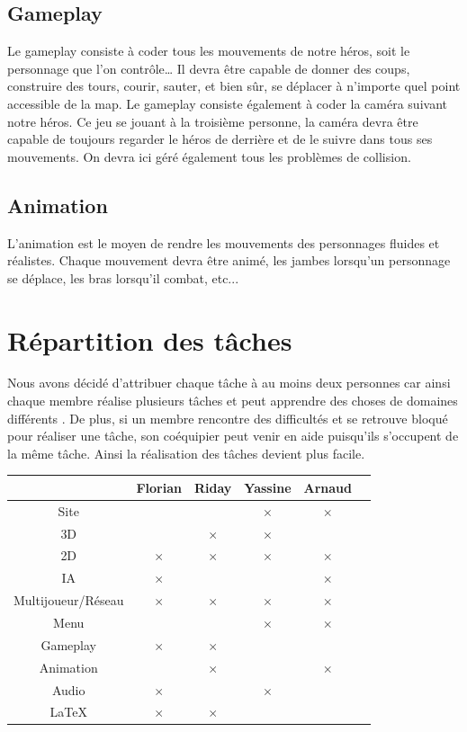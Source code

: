 \documentclass[a4paper, 12pt]{article}
\begin{document}
	\subsection{Gameplay}
	Le gameplay consiste à coder tous les mouvements de notre héros, soit le personnage que l’on contrôle… Il devra être capable de donner des coups, construire des tours, courir, sauter, et bien sûr, se déplacer à n’importe quel point accessible de la map. Le gameplay consiste également à coder la caméra suivant notre héros. Ce jeu se jouant à la troisième personne, la caméra devra être capable de toujours regarder le héros de derrière et de le suivre dans tous ses mouvements. On devra ici géré également tous les problèmes de collision.
	\subsection{Animation}
	L’animation est le moyen de rendre les mouvements des personnages fluides et réalistes. Chaque mouvement devra être animé, les jambes lorsqu’un personnage se déplace, les bras lorsqu’il combat, etc...



\section{Répartition des tâches}
Nous avons décidé d’attribuer chaque tâche à au moins deux personnes car ainsi chaque membre réalise plusieurs tâches et peut apprendre des choses de domaines différents . De plus, si un membre rencontre des difficultés et se retrouve bloqué pour réaliser une tâche, son coéquipier peut venir en aide puisqu’ils s’occupent de la même tâche. Ainsi la réalisation des tâches devient plus facile.
\bigbreak
\bigbreak
	\begin{tabular}{|c||c|c|c|c|c|}
		\hline
		& Florian & Riday & Yassine & Arnaud \\
		\hline
		Site & & & $\times$ & $\times$\\
		\hline
		3D & & $\times$ & $\times$ &\\
		\hline
		2D & $\times$ & $\times$ & $\times$ & $\times$ \\
		\hline
		IA & $\times$ & & & $\times$\\
		\hline
		Multijoueur/Réseau & $\times$ & $\times$ & $\times$ & $\times$\\
		\hline
		Menu & & & $\times$ & $\times$\\
		\hline
		Gameplay & $\times$ & $\times$ & &\\
		\hline
		Animation & & $\times$ & & $\times$\\		
		\hline
		Audio & $\times$ & & $\times$ &\\
		\hline
		\LaTeX & $\times$ & $\times$ & &\\
		\hline
	\end{tabular}
	\newpage
\end{document}
